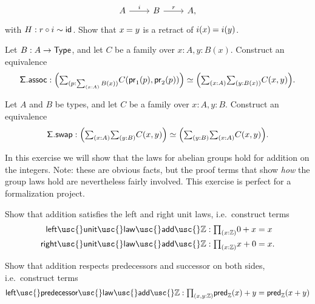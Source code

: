 \begin{exercises}
\begin{equation*}
\begin{tikzcd}
A \arrow[r,"i"] & B \arrow[r,"r"] & A,
\end{tikzcd}
\end{equation*}
with $H:r\circ i\sim \mathsf{id}_{}$. Show that $\id{x}{y}$ is a retract of $\id{i(x)}{i(y)}$.
\item \label{ex:sigma_assoc}Let $B:A\to \mathsf{Type}$, and let $C$ be a family over $x:A,y:B(x)$. Construct an equivalence
\begin{equation*}
\mathsf{\Sigma.assoc}:\eqv{\Big(\sm{p:\sm{x:A}B(x)}C(\proj 1(p),\proj 2(p))\Big)}{\Big(\sm{x:A}\sm{y:B(x)}C(x,y)\Big)}.
\end{equation*}
\item \label{ex:sigma_swap}Let $A$ and $B$ be types, and let $C$ be a family over $x:A,y:B$. Construct an equivalence
\begin{equation*}
\mathsf{\Sigma.swap}:\eqv{\Big(\sm{x:A}{y:B}C(x,y)\Big)}{\Big(\sm{y:B}{x:A}C(x,y)\Big)}.
\end{equation*}
\item \label{ex:int_group_laws} In this exercise we will show that the laws for abelian groups hold for addition on the integers. Note: these are obvious facts, but the proof terms that show \emph{how} the group laws hold are nevertheless fairly involved. This exercise is perfect for a formalization project. 
\begin{subexenum}
\item Show that addition satisfies the left and right unit laws, i.e.~construct terms
\begin{align*}
\mathsf{left\usc{}unit\usc{}law\usc{}add\usc{}}\Z  & : \prd{x:\Z} 0 + x = x \\
\mathsf{right\usc{}unit\usc{}law\usc{}add\usc{}}\Z  & : \prd{x : \Z} x + 0 = x.
\end{align*}
\item Show that addition respects predecessors and successor on both sides, i.e.~construct terms
\begin{align*}
\mathsf{left\usc{}predecessor\usc{}law\usc{}add\usc{}}\Z & : \prd{x,y:\Z} \mathsf{pred}_{\mathbb{Z}}(x)+y = \mathsf{pred}_{\mathbb{Z}}(x+y) \\

\end{align*}
\end{subexenum}
\end{exercises}
